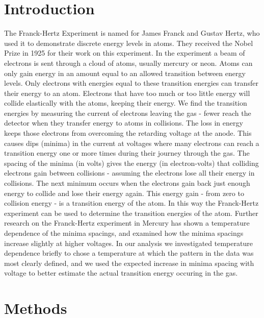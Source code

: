 \documentclass[prb,preprint]{revtex4-1}
\begin{document}
\maketitle

\section{Introduction} 

The Franck-Hertz Experiment is named for James Franck and Gustav Hertz, who used it to demonstrate discrete energy levels in atoms. 
They received the Nobel Prize in 1925 for their work on this experiment. 
In the experiment a beam of electrons is sent through a cloud of atoms, usually mercury or neon. 
Atoms can only gain energy in an amount equal to an allowed transition between energy levels. 
Only electrons with energies equal to these transition energies can transfer their energy to an atom. 
Electrons that have too much or too little energy will collide elastically with the atoms, keeping their energy. 
We find the transition energies by measuring the current of electrons leaving the gas - fewer reach the detector when they transfer energy to atoms in collisions. 
The loss in energy keeps those electrons from overcoming the retarding voltage at the anode. 
This causes dips (minima) in the current at voltages where many electrons can reach a transition energy one or more times during their journey through the gas. 
The spacing of the minima (in volts) gives the energy (in electron-volts) that colliding electrons gain between collisions - assuming the electrons lose all their energy in collisions. 
The next minimum occurs when the electrons gain back just enough energy to collide and lose their energy again. 
This energy gain - from zero to collision energy - is a transition energy of the atom. 
In this way the Franck-Hertz experiment can be used to determine the transition energies of the atom. 
Further research on the Franck-Hertz experiment in Mercury has shown a temperature dependence of the minima spacings, and examined how the minima spacings increase slightly at higher voltages. 
In our analysis we investigated temperature dependence briefly to chose a temperature at which the pattern in the data was most clearly defined, and we used the expected increase in minima spacing with voltage to better estimate the actual transition energy occuring in the gas. 


\section{Methods}
\end{document}
